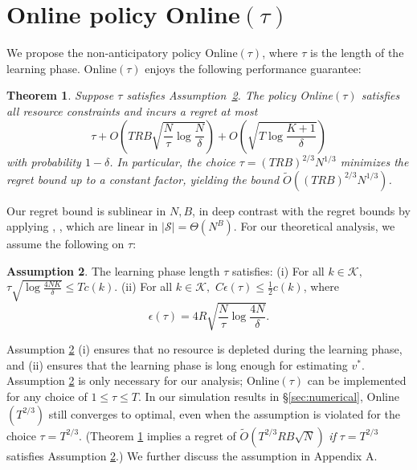 \documentclass{article}
\newtheorem{theorem}{Theorem}[section]
\theoremstyle{definition}
\newtheorem{assumption}[theorem]{Assumption}
\newcommand{\KKK}{\mathcal{K}}
\newcommand{\NNN}{\mathcal{N}}
\newcommand{\SSS}{\mathcal{S}}
\begin{document}
\section{Online policy {\sc Online}$(\tau)$}\label{sec:policy}
We propose the non-anticipatory policy {\sc Online}$(\tau)$, where $\tau$ is the length of the learning phase. {\sc Online}$(\tau)$ enjoys the following performance guarantee:
\begin{theorem}\label{thm:simpleregret}
Suppose $\tau$ satisfies Assumption~\ref{ass:tau}. The policy {\sc Online}$(\tau)$ satisfies all resource constraints and incurs a regret at most
\begin{equation}\label{eq:regret_bound}
\tau + O\left(TRB\sqrt{\frac{N}{\tau}\log\frac{N}{\delta}}\right) + O \left(\sqrt{T\log \frac{K+1}{\delta}}\right) 
\end{equation}
with probability $1-\delta$. In particular, the choice $\tau = (TRB)^{2/3}N^{1/3}$ minimizes the regret bound up to a constant factor, yielding the bound $\tilde{O}((TRB)^{2/3}N^{1/3})$. %
\end{theorem}
Our regret bound is sublinear in $N, B$, in deep contrast with the regret bounds by applying \cite{BadanidiyuruKS13}, \cite{AgrawalD14}, which are linear in $|\SSS | = \Theta(N^B)$. For our theoretical analysis, we assume the following on $\tau$:
\begin{assumption}\label{ass:tau}
The learning phase length $\tau$ satisfies: (i) For all $k\in \KKK,$ $\tau\sqrt{\log \frac{4NK}{\delta}}\leq T c(k)$. (ii) For all $k\in \KKK,$ $C\epsilon(\tau)\leq \frac{1}{2}c(k)$, where 
\begin{equation}\label{eq:defepsilon}
\epsilon(\tau) = 4R \sqrt{\frac{N}{\tau}\log\frac{4N}{\delta}}.
\end{equation}
\end{assumption}
Assumption \ref{ass:tau} (i) ensures that no resource is depleted during the learning phase, and (ii) ensures that the learning phase is long enough for estimating $v^*$. Assumption \ref{ass:tau} is only necessary for our analysis; {\sc Online}$(\tau)$ can be implemented for any choice of $1\leq \tau \leq T$. In our simulation results in \S \ref{sec:numerical}, {\sc Online}$(T^{2/3})$ still converges to optimal, even when the assumption is violated for the choice $\tau = T^{2/3}$. (Theorem \ref{thm:simpleregret} implies a regret of $\tilde{O}(T^{2/3}R B \sqrt{N})$ \emph{if} $\tau = T^{2/3}$ satisfies Assumption \ref{ass:tau}.) We further discuss the assumption in Appendix A.
\end{document}
